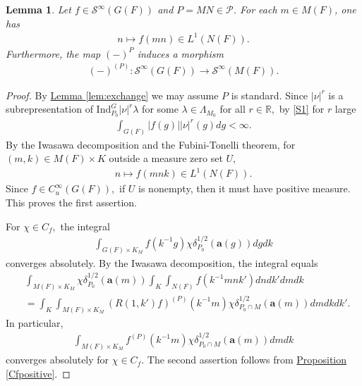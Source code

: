 \documentclass[10pt]{amsart}
\newtheorem{lemma}[theorem]{Lemma}
\theoremstyle{definition}
\numberwithin{equation}{section}
\numberwithin{equation}{subsection}
\newcommand{\RR}{\mathbb{R}}
\begin{document}
\begin{lemma}\label{lemma:constant} Let $f\in \mathcal{S}^\infty(G(F))$ and $P=MN\in \mathcal{P}$.
For each $m\in M(F)$, one has
\begin{align*}
    n\mapsto f(mn) \in L^1(N(F)).
\end{align*}    
Furthermore, the map $(-)^P$ induces a morphism
\begin{align*}
    (-)^{(P)}:\mathcal{S}^\infty(G(F))\longrightarrow\mathcal{S}^\infty(M(F)).
\end{align*}
\end{lemma}

\begin{proof} 
  By \hyperref[lem:exchange]{Lemma \ref{lem:exchange}} we may assume $P$ is standard. Since $|\nu|^r$ is a subrepresentation of $\mathrm{Ind}_{P_0}^G |\nu|^r\lambda$ for some $\lambda\in \Lambda_{M_0}$ for all $r\in \RR,$ by \eqref{S1} for $r$ large
  \begin{align*}
      \int_{G(F)} |f(g)||\nu|^r(g) dg <\infty.
  \end{align*}
  By the Iwasawa decomposition and the Fubini-Tonelli theorem, for $(m,k)\in M(F)\times K$ outside a measure zero set $U,$
  \begin{align*}
      n\mapsto f(mnk)\in L^1(N(F)).
  \end{align*}
  Since $f\in C^\infty_u(G(F)),$ if $U$ is nonempty, then it must have positive measure. This proves the first assertion.
  
  
  For $\chi\in C_f,$ the integral 
    \begin{align*}
        \int_{G(F)\times K_M} f(k^{-1}g)\chi\delta_{P_0}^{1/2}(\mathbf{a}(g))dgdk
    \end{align*}
    converges absolutely. By the Iwasawa decomposition, the integral equals
    \begin{align*}
        &\int_{M(F)\times K_M}\chi\delta_{P_0}^{1/2}(\mathbf{a}(m)) \int_K\int_{N(F)} f(k^{-1}mnk')dndk'dmdk\\
        &=\int_{K}\int_{M(F)\times K_M} (R(1,k')f)^{(P)}(k^{-1}m)\chi\delta_{P_0\cap M}^{1/2}(\mathbf{a}(m)) dmdkdk'.
    \end{align*}
    In particular, 
    \begin{align*}
        \int_{M(F)\times K_M}f^{(P)}(k^{-1}m)\chi\delta_{P_0\cap M}^{1/2}(\mathbf{a}(m))dmdk
    \end{align*}
    converges absolutely for $\chi\in C_f.$ The second assertion follows from \hyperref[Cfpositive]{Proposition \ref{Cfpositive}}.
\end{proof}
\end{document}
